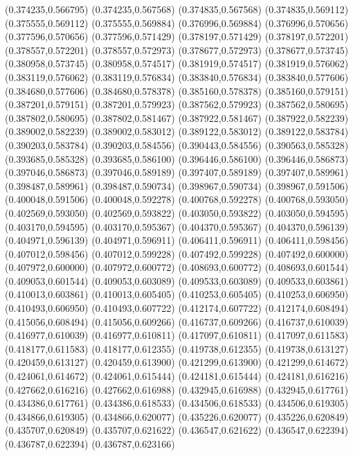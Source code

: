 (0.374235,0.566795)
(0.374235,0.567568)
(0.374835,0.567568)
(0.374835,0.569112)
(0.375555,0.569112)
(0.375555,0.569884)
(0.376996,0.569884)
(0.376996,0.570656)
(0.377596,0.570656)
(0.377596,0.571429)
(0.378197,0.571429)
(0.378197,0.572201)
(0.378557,0.572201)
(0.378557,0.572973)
(0.378677,0.572973)
(0.378677,0.573745)
(0.380958,0.573745)
(0.380958,0.574517)
(0.381919,0.574517)
(0.381919,0.576062)
(0.383119,0.576062)
(0.383119,0.576834)
(0.383840,0.576834)
(0.383840,0.577606)
(0.384680,0.577606)
(0.384680,0.578378)
(0.385160,0.578378)
(0.385160,0.579151)
(0.387201,0.579151)
(0.387201,0.579923)
(0.387562,0.579923)
(0.387562,0.580695)
(0.387802,0.580695)
(0.387802,0.581467)
(0.387922,0.581467)
(0.387922,0.582239)
(0.389002,0.582239)
(0.389002,0.583012)
(0.389122,0.583012)
(0.389122,0.583784)
(0.390203,0.583784)
(0.390203,0.584556)
(0.390443,0.584556)
(0.390563,0.585328)
(0.393685,0.585328)
(0.393685,0.586100)
(0.396446,0.586100)
(0.396446,0.586873)
(0.397046,0.586873)
(0.397046,0.589189)
(0.397407,0.589189)
(0.397407,0.589961)
(0.398487,0.589961)
(0.398487,0.590734)
(0.398967,0.590734)
(0.398967,0.591506)
(0.400048,0.591506)
(0.400048,0.592278)
(0.400768,0.592278)
(0.400768,0.593050)
(0.402569,0.593050)
(0.402569,0.593822)
(0.403050,0.593822)
(0.403050,0.594595)
(0.403170,0.594595)
(0.403170,0.595367)
(0.404370,0.595367)
(0.404370,0.596139)
(0.404971,0.596139)
(0.404971,0.596911)
(0.406411,0.596911)
(0.406411,0.598456)
(0.407012,0.598456)
(0.407012,0.599228)
(0.407492,0.599228)
(0.407492,0.600000)
(0.407972,0.600000)
(0.407972,0.600772)
(0.408693,0.600772)
(0.408693,0.601544)
(0.409053,0.601544)
(0.409053,0.603089)
(0.409533,0.603089)
(0.409533,0.603861)
(0.410013,0.603861)
(0.410013,0.605405)
(0.410253,0.605405)
(0.410253,0.606950)
(0.410493,0.606950)
(0.410493,0.607722)
(0.412174,0.607722)
(0.412174,0.608494)
(0.415056,0.608494)
(0.415056,0.609266)
(0.416737,0.609266)
(0.416737,0.610039)
(0.416977,0.610039)
(0.416977,0.610811)
(0.417097,0.610811)
(0.417097,0.611583)
(0.418177,0.611583)
(0.418177,0.612355)
(0.419738,0.612355)
(0.419738,0.613127)
(0.420459,0.613127)
(0.420459,0.613900)
(0.421299,0.613900)
(0.421299,0.614672)
(0.424061,0.614672)
(0.424061,0.615444)
(0.424181,0.615444)
(0.424181,0.616216)
(0.427662,0.616216)
(0.427662,0.616988)
(0.432945,0.616988)
(0.432945,0.617761)
(0.434386,0.617761)
(0.434386,0.618533)
(0.434506,0.618533)
(0.434506,0.619305)
(0.434866,0.619305)
(0.434866,0.620077)
(0.435226,0.620077)
(0.435226,0.620849)
(0.435707,0.620849)
(0.435707,0.621622)
(0.436547,0.621622)
(0.436547,0.622394)
(0.436787,0.622394)
(0.436787,0.623166)
